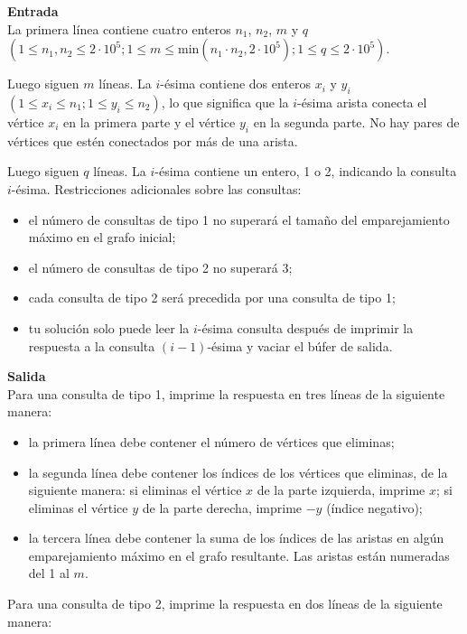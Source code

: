 \documentclass{article}
\begin{document}
\textbf{Entrada}\\

La primera línea contiene cuatro enteros $n_1$, $n_2$, $m$ y $q$ $(1 \leq n_1,n_2 \leq 2\cdot 10^5; 1 \leq m \leq \text{min}(n_1 \cdot n_2, 2 \cdot 10^5); 1 \leq q \leq 2\cdot 10^5)$.

Luego siguen $m$ líneas. La $i$-ésima contiene dos enteros $x_i$ y $y_i$ $(1\leq x_i \leq n_1; 1 \leq y_i \leq n_2)$, lo que significa que la $i$-ésima arista conecta el vértice $x_i$ en la primera parte y el vértice $y_i$ en la segunda parte. No hay pares de vértices que estén conectados por más de una arista.

Luego siguen $q$ líneas. La $i$-ésima contiene un entero, 1 o 2, indicando la consulta $i$-ésima. Restricciones adicionales sobre las consultas:

\begin{itemize}
    \item el número de consultas de tipo 1 no superará el tamaño del emparejamiento máximo en el grafo inicial;
    \item el número de consultas de tipo 2 no superará 3;
    \item cada consulta de tipo 2 será precedida por una consulta de tipo 1;
    \item tu solución solo puede leer la $i$-ésima consulta después de imprimir la respuesta a la consulta $(i-1)$-ésima y vaciar el búfer de salida.
\end{itemize}

\textbf{Salida}\\

Para una consulta de tipo 1, imprime la respuesta en tres líneas de la siguiente manera:

\begin{itemize}
    \item la primera línea debe contener el número de vértices que eliminas;
    \item la segunda línea debe contener los índices de los vértices que eliminas, de la siguiente manera: si eliminas el vértice $x$ de la parte izquierda, imprime $x$; si eliminas el vértice $y$ de la parte derecha, imprime $-y$ (índice negativo);
    \item la tercera línea debe contener la suma de los índices de las aristas en algún emparejamiento máximo en el grafo resultante. Las aristas están numeradas del 1 al $m$.
\end{itemize}

Para una consulta de tipo 2, imprime la respuesta en dos líneas de la siguiente manera:
\end{document}
